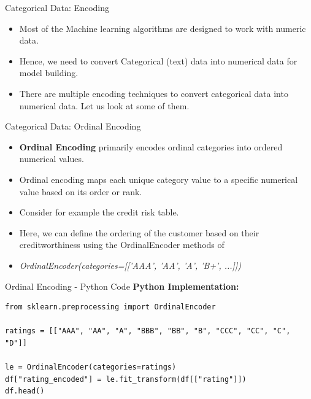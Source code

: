 \documentclass[11pt]{beamer}
\begin{document}
%
%
\begin{frame}{Categorical Data: Encoding}
	\begin{itemize}
		\item Most of the Machine learning algorithms are designed to work with numeric data. 
		\item Hence, we need to convert Categorical (text) data into numerical data for model building. 
		\item There are multiple encoding techniques to convert categorical data into numerical data. Let us look at some of them.
	\end{itemize}
\end{frame}
%
%
\begin{frame}{Categorical Data: Ordinal Encoding}
	\begin{itemize}
		\item \textbf{Ordinal Encoding} primarily encodes ordinal categories into ordered numerical values. 
		\item Ordinal encoding maps each unique category value to a specific numerical value based on its order or rank. 
		\item Consider for example the credit risk table. 
		\item Here, we can define the ordering of the customer based on their creditworthiness using the OrdinalEncoder methods of  
		\item \textit{OrdinalEncoder(categories=[['AAA', 'AA', 'A', 'B+', ...]])}
	\end{itemize}
\end{frame}
%
%
\begin{frame}[fragile]{Ordinal Encoding - Python Code}
    \textbf{Python Implementation:}
\footnotesize{
    \begin{verbatim}
from sklearn.preprocessing import OrdinalEncoder

ratings = [["AAA", "AA", "A", "BBB", "BB", "B", "CCC", "CC", "C", "D"]]

le = OrdinalEncoder(categories=ratings)
df["rating_encoded"] = le.fit_transform(df[["rating"]])
df.head()    
\end{verbatim}
    }
\end{frame}
%
%
\end{document}

